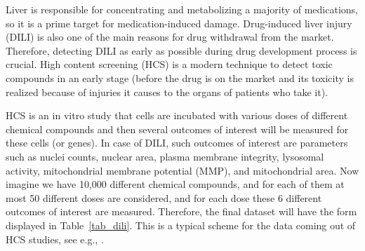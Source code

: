 \documentclass[11pt,a5paper,twoside]{book}
\begin{document}
Liver is responsible for concentrating and metabolizing a majority of medications, so it is a prime target for medication-induced damage. Drug-induced liver injury (DILI) is also one of the main reasons for drug withdrawal from the market. Therefore, detecting DILI as early as possible during drug development process is crucial. High content screening (HCS) is a modern technique to detect toxic compounds in an early stage (before the drug is on the market and its toxicity is realized because of injuries it causes to the organs of patients who take it). 

HCS is an in vitro study that cells are incubated with various doses of different chemical compounds and then several outcomes of interest will be measured for these cells (or genes). In case of DILI, such outcomes of interest are parameters such as nuclei counts, nuclear area, plasma membrane integrity, lysosomal activity, mitochondrial membrane potential (MMP), and mitochondrial area. Now imagine we have 10,000 different chemical compounds, and for each of them at most 50 different doses are considered, and for each dose these 6 different outcomes of interest are measured. Therefore, the final dataset will have the form displayed in Table~\ref{tab_dili}. This is a typical scheme for the data coming out of HCS studies, see e.g., \cite{kaliyaperumal2018pharmacogenomics}.
\end{document}
